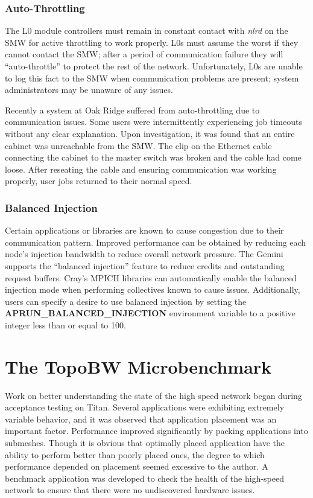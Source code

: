 \documentclass[10pt, conference, compsocconf]{IEEEtran}
\begin{document}
\subsubsection{Auto-Throttling}

The L0 module controllers must remain in constant contact with \emph{nlrd} on
the SMW for active throttling to work properly.  L0s must assume the worst if
they cannot contact the SMW; after a period of communication failure they will
``auto-throttle'' to protect the rest of the network.  Unfortunately, L0s are
unable to log this fact to the SMW when communication problems are present;
system administrators may be unaware of any issues.

Recently a system at Oak Ridge suffered from auto-throttling due to
communication issues.  Some users were intermittently experiencing job timeouts
without any clear explanation.  Upon investigation, it was found that an entire
cabinet was unreachable from the SMW.  The clip on the Ethernet cable
connecting the cabinet to the master switch was broken and the cable had come
loose.  After reseating the cable and ensuring communication was working
properly, user jobs returned to their normal speed.

\subsubsection{Balanced Injection}

\label{sec:bi}

Certain applications or libraries are known to cause congestion due to their
communication pattern.  Improved performance can be obtained by reducing each
node's injection bandwidth to reduce overall network pressure.  The Gemini
supports the ``balanced injection'' feature to reduce credits and outstanding
request buffers.  Cray's MPICH libraries can automatically enable the balanced
injection mode when performing collectives known to cause issues.
Additionally, users can specify a desire to use balanced injection by setting
the \textbf{APRUN\_BALANCED\_INJECTION} environment variable to a positive
integer less than or equal to 100.

\section{The TopoBW Microbenchmark}

Work on better understanding the state of the high speed network began during
acceptance testing on Titan.  Several applications were exhibiting extremely
variable behavior, and it was observed that application placement was an
important factor.  Performance improved significantly by packing applications
into submeshes.  Though it is obvious that optimally placed application have
the ability to perform better than poorly placed ones, the degree to which
performance depended on placement seemed excessive to the author.  A benchmark
application was developed to check the health of the high-speed network to
ensure that there were no undiscovered hardware issues.
\end{document}

